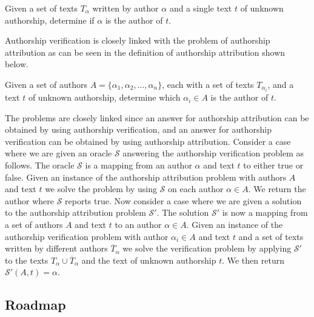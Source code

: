 \begin{definition}
    \label{def:authorship_verification}

    Given a set of texts $T_\alpha$ written by author $\alpha$ and a single text
    $t$ of unknown authorship, determine if $\alpha$ is the author of $t$.

\end{definition}

Authorship verification is closely linked with the problem of authorship
attribution as can be seen in the definition of authorship attribution shown
below.

\begin{definition}

    Given a set of authors $A = \{\alpha_1, \alpha_2,\dots,\alpha_n\}$, each
    with a set of texts $T_{\alpha_i}$, and a text $t$ of unknown authorship,
    determine which $\alpha_i \in A$ is the author of $t$.

\end{definition}

The problems are closely linked since an answer for authorship attribution
can be obtained by using authorship verification, and an answer for authorship
verification can be obtained by using authorship attribution. Consider a
case where we are given an oracle $\mathcal{S}$ answering the authorship
verification problem as follows. The oracle $\mathcal{S}$ is a mapping from
an author $\alpha$ and text $t$ to either true or false. Given an instance
of the authorship attribution problem with authors $A$ and text $t$ we solve
the problem by using $\mathcal{S}$ on each author $\alpha \in A$. We return
the author where $\mathcal{S}$ reports true. Now consider a case where we are
given a solution to the authorship attribution problem $\mathcal{S}'$. The
solution $\mathcal{S}'$ is now a mapping from a set of authors $A$ and text $t$
to an author $\alpha \in A$. Given an instance of the authorship verification
problem with author $\alpha_i \in A$ and text $t$ and a set of texts written by
different authors $\overline{T}_{\alpha}$ we solve the verification problem by
applying $\mathcal{S}'$ to the texts $T_{\alpha} \cup \overline{T}_{\alpha}$
and the text of unknown authorship $t$. We then return $\mathcal{S}'(A, t) =
\alpha$.

\subsection{Roadmap}

